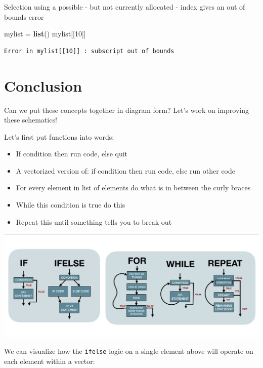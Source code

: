 \documentclass[]{book}
\newenvironment{Shaded}{\begin{snugshade}}{\end{snugshade}}
\newcommand{\DecValTok}[1]{\textcolor[rgb]{0.00,0.00,0.81}{#1}}
\newcommand{\KeywordTok}[1]{\textcolor[rgb]{0.13,0.29,0.53}{\textbf{#1}}}
\newcommand{\NormalTok}[1]{#1}
\newcommand{\StringTok}[1]{\textcolor[rgb]{0.31,0.60,0.02}{#1}}
\providecommand{\tightlist}{%
  \setlength{\itemsep}{0pt}\setlength{\parskip}{0pt}}
\begin{document}
Selection using a possible - but not currently allocated - index gives an out of bounds error

\begin{Shaded}
\begin{Highlighting}[]
\NormalTok{mylist =}\StringTok{ }\KeywordTok{list}\NormalTok{()}
\NormalTok{mylist[[}\DecValTok{10}\NormalTok{]]}
\end{Highlighting}
\end{Shaded}

\begin{verbatim}
Error in mylist[[10]] : subscript out of bounds 
\end{verbatim}

\hypertarget{conclusion-1}{%
\section*{Conclusion}\label{conclusion-1}}

Can we put these concepts together in diagram form? Let's work on improving these schematics!

Let's first put functions into words:

\begin{itemize}
\tightlist
\item
  If condition then run code, else quit
\item
  A vectorized version of: if condition then run code, else run other code
\item
  For every element in list of elements do what is in between the curly braces
\item
  While this condition is true do this
\item
  Repeat this until something tells you to break out
\end{itemize}

\includegraphics[width=40in]{images/controlflow}

We can visualize how the \texttt{ifelse} logic on a single element above will operate on each element within a vector:
\end{document}
